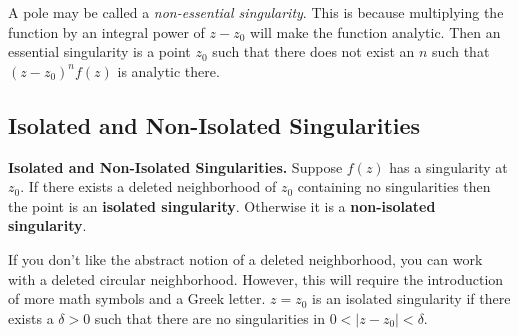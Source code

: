 A pole may be called a \textit{non-essential singularity}.  This is because
multiplying the function by an integral power of $z - z_0$ will make 
the function analytic.  Then an essential singularity is a point $z_0$ 
such that there does not exist an $n$ such that $\left( z - z_0 \right)^n f(z)$
is analytic there.






\subsection{Isolated and Non-Isolated Singularities}





\begin{Result}
  \textbf{Isolated and Non-Isolated Singularities.}
  Suppose $f(z)$ has a singularity at $z_0$.  If there exists a deleted 
  neighborhood of $z_0$ containing no singularities then the point is 
  an \textbf{isolated singularity}.  Otherwise it is a 
  \textbf{non-isolated singularity}.
\end{Result}


If you don't like the abstract notion of a deleted neighborhood, you
can work with a deleted circular neighborhood.  However, this will require 
the introduction of more math symbols and a Greek letter.
$z = z_0$ is an isolated singularity if there exists a $\delta > 0$
such that there are no singularities in $0 < |z - z_0| < \delta$.





